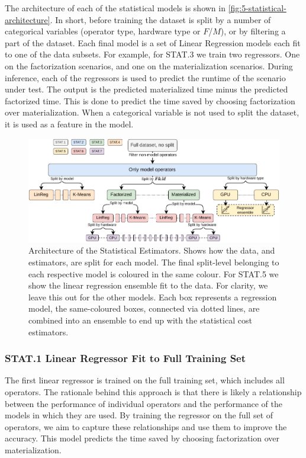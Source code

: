 The architecture of each of the statistical models is shown in \autoref{fig:5-statistical-architecture}. In short, before training the dataset is split by a number of categorical variables (operator type, hardware type or $F$/$M$), or by filtering a part of the dataset. Each final model is a set of Linear Regression models each fit to one of the data subsets. For example, for STAT.3 we train two regressors. One on the factorization scenarios, and one on the materialization scenarios. During inference, each of the regressors is used to predict the runtime of the scenario under test. The output is the predicted materialized time minus the predicted factorized time. This is done to predict the time saved by choosing factorization over materialization. When a categorical variable is not used to split the dataset, it is used as a feature in the model.

\begin{figure}[ht]
    \centering
    \includegraphics[width=\linewidth]{chapters/05_cost_estimation/figures/statistical-architecture.pdf}
    \caption[Statistical Estimator Architecture]{Architecture of the Statistical Estimators. Shows how the data, and estimators, are split for each model. The final split-level belonging to each respective model is coloured in the same colour. For STAT.5 we show the linear regression ensemble fit to the data. For clarity, we leave this out for the other models. Each box represents a regression model, the same-coloured boxes, connected via dotted lines, are combined into an ensemble to end up with the statistical cost estimators.}
    \label{fig:5-statistical-architecture}
\end{figure}

\subsubsection*{STAT.1 Linear Regressor Fit to Full Training Set}
The first linear regressor is trained on the full training set, which includes all operators. The rationale behind this approach is that there is likely a relationship between the performance of individual operators and the performance of the models in which they are used. By training the regressor on the full set of operators, we aim to capture these relationships and use them to improve the accuracy. This model predicts the time saved by choosing factorization over materialization.

